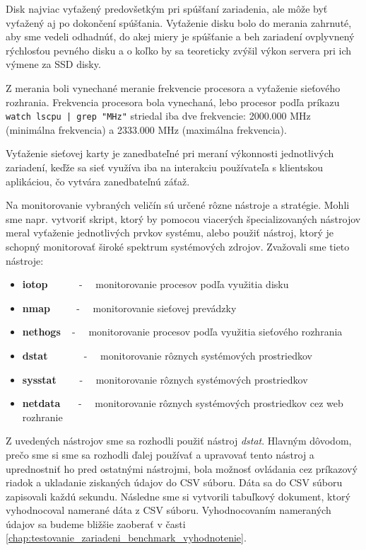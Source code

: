 Disk najviac vyťažený predovšetkým pri spúšťaní zariadenia, ale môže byť vyťažený aj po dokončení spúšťania. Vyťaženie disku bolo do merania zahrnuté, aby sme vedeli odhadnúť, do akej miery je spúšťanie a beh zariadení ovplyvnený rýchlosťou pevného disku a o koľko by sa teoreticky zvýšil výkon servera pri ich výmene za SSD disky.

Z merania boli vynechané meranie frekvencie procesora a vyťaženie sieťového rozhrania. Frekvencia procesora bola vynechaná, lebo procesor podľa príkazu \texttt{watch lscpu | grep "MHz"} striedal iba dve frekvencie: 2000.000 MHz (minimálna frekvencia) a 2333.000 MHz (maximálna frekvencia).

Vyťaženie sieťovej karty je zanedbateľné pri meraní výkonnosti jednotlivých zariadení, keďže sa sieť využíva iba na interakciu používateľa s klientskou aplikáciou, čo vytvára zanedbateľnú záťaž.

Na monitorovanie vybraných veličín sú určené rôzne nástroje a stratégie. Mohli sme napr. vytvoriť skript, ktorý by pomocou viacerých špecializovaných nástrojov meral vyťaženie jednotlivých prvkov systému, alebo použiť nástroj, ktorý je schopný monitorovať široké spektrum systémových zdrojov. Zvažovali sme tieto nástroje:

\begin{itemize}[noitemsep]
    \item \textbf{iotop} ~~~~~ - ~~monitorovanie procesov podľa využitia disku
    \item \textbf{nmap} ~~~~ - ~~monitorovanie sieťovej prevádzky
    \item \textbf{nethogs} ~ - ~~monitorovanie procesov podľa využitia sieťového rozhrania
    \item \textbf{dstat} ~~~~~~ - ~~monitorovanie rôznych systémových prostriedkov
    \item \textbf{sysstat} ~~~~- ~~monitorovanie rôznych systémových prostriedkov
    \item \textbf{netdata} ~~~- ~~monitorovanie rôznych systémových prostriedkov cez web rozhranie
\end{itemize}

Z uvedených nástrojov sme sa rozhodli použiť nástroj \emph{dstat}. Hlavným dôvodom, prečo sme si sme sa rozhodli ďalej používať a upravovať tento nástroj a uprednostniť ho pred ostatnými nástrojmi, bola možnosť ovládania cez príkazový riadok a ukladanie ziskaných údajov do CSV súboru. Dáta sa do CSV súboru zapisovali každú sekundu. Následne sme si vytvorili tabuľkový dokument, ktorý vyhodnocoval namerané dáta z CSV súboru. Vyhodnocovaním nameraných údajov sa budeme bližšie zaoberať v časti \ref{chap:testovanie_zariadeni_benchmark_vyhodnotenie}.

